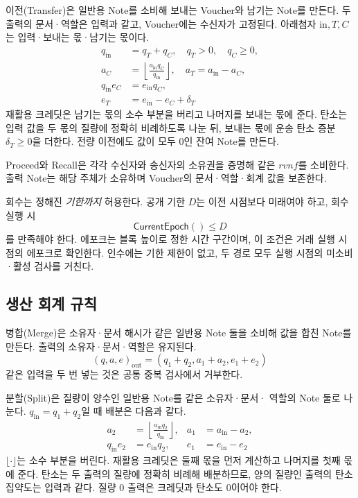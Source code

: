 이전(Transfer)은 일반용 Note를 소비해 보내는 Voucher와
남기는 Note를 만든다. 두 출력의 문서·역할은 입력과 같고,
Voucher에는 수신자가 고정된다.
아래첨자 $\mathrm{in},T,C$는 입력·보내는 몫·남기는 몫이다.
\begin{align}
 q_{\mathrm{in}}&=q_T+q_C,\quad q_T>0,\quad q_C\geq0,\nonumber\\
 a_C&=\left\lfloor\frac{a_{\mathrm{in}}q_C}{q_{\mathrm{in}}}\right\rfloor,
 \quad a_T=a_{\mathrm{in}}-a_C,\nonumber\\
 q_{\mathrm{in}}e_C&=e_{\mathrm{in}}q_C,\nonumber\\
 e_T&=e_{\mathrm{in}}-e_C+\delta_T
 \label{eq:transfer}
\end{align}
재활용 크레딧은 남기는 몫의 소수 부분을 버리고 나머지를 보내는
몫에 준다. 탄소는 입력 값을 두 몫의 질량에 정확히 비례하도록
나눈 뒤, 보내는 몫에 운송 탄소 증분 $\delta_T\geq0$을 더한다. 전량 이전에도
값이 모두 0인 잔여 Note를 만든다.

Proceed와 Recall은 각각 수신자와 송신자의 소유권을 증명해
같은 $rvnf$를 소비한다. 출력 Note는 해당 주체가 소유하며
Voucher의 문서·역할·회계 값을 보존한다.

회수는 정해진 \emph{기한까지} 허용한다.
공개 기한 $D$는 이전 시점보다 미래여야 하고, 회수 실행 시
\begin{equation}
 \mathsf{CurrentEpoch}()\leq D
 \label{eq:recall}
\end{equation}
를 만족해야 한다. 에포크는 블록 높이로 정한 시간 구간이며,
이 조건은 거래 실행 시점의 에포크로 확인한다. 인수에는 기한 제한이 없고,
두 경로 모두 실행 시점의 미소비·활성 검사를 거친다.

\subsection{생산 회계 규칙}

병합(Merge)은 소유자·문서 해시가 같은 일반용 Note 둘을 소비해
값을 합친 Note를 만든다. 출력의 소유자·문서·역할은 유지된다.
\begin{equation}
 (q,a,e)_{\mathrm{out}}=(q_1+q_2,a_1+a_2,e_1+e_2)
 \label{eq:merge}
\end{equation}
같은 입력을 두 번 넣는 것은 공통 중복 검사에서 거부한다.

분할(Split)은 질량이 양수인 일반용 Note를 같은 소유자·문서·
역할의 Note 둘로 나눈다.
$q_{\mathrm{in}}=q_1+q_2$일 때 배분은 다음과 같다.
\begin{align}
 a_2&=\left\lfloor\frac{a_{\mathrm{in}}q_2}{q_{\mathrm{in}}}\right\rfloor,
 &a_1&=a_{\mathrm{in}}-a_2,\nonumber\\
 q_{\mathrm{in}}e_2&=e_{\mathrm{in}}q_2,
 &e_1&=e_{\mathrm{in}}-e_2
 \label{eq:split}
\end{align}
$\lfloor\cdot\rfloor$는 소수 부분을 버린다. 재활용 크레딧은 둘째 몫을
먼저 계산하고 나머지를 첫째 몫에 준다. 탄소는 두 출력의 질량에
정확히 비례해 배분하므로, 양의 질량인 출력의 탄소 집약도는 입력과 같다.
질량 0 출력은 크레딧과 탄소도 0이어야 한다.

